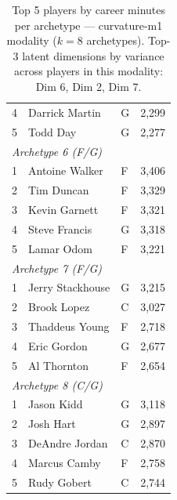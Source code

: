 \begin{table}[htbp]
\begin{tabular}{rlll}
    4 & Darrick Martin & G & 2,299 \\
    5 & Todd Day & G & 2,277 \\
    \midrule[0.4pt]
    \multicolumn{4}{l}{\textit{Archetype 6 (F/G)}} \\
    \midrule
    1 & Antoine Walker & F & 3,406 \\
    2 & Tim Duncan & F & 3,329 \\
    3 & Kevin Garnett & F & 3,321 \\
    4 & Steve Francis & G & 3,318 \\
    5 & Lamar Odom & F & 3,221 \\
    \midrule[0.4pt]
    \multicolumn{4}{l}{\textit{Archetype 7 (F/G)}} \\
    \midrule
    1 & Jerry Stackhouse & G & 3,215 \\
    2 & Brook Lopez & C & 3,027 \\
    3 & Thaddeus Young & F & 2,718 \\
    4 & Eric Gordon & G & 2,677 \\
    5 & Al Thornton & F & 2,654 \\
    \midrule[0.4pt]
    \multicolumn{4}{l}{\textit{Archetype 8 (C/G)}} \\
    \midrule
    1 & Jason Kidd & G & 3,118 \\
    2 & Josh Hart & G & 2,897 \\
    3 & DeAndre Jordan & C & 2,870 \\
    4 & Marcus Camby & F & 2,758 \\
    5 & Rudy Gobert & C & 2,744 \\
    \bottomrule
  \end{tabular}
  \caption{Top 5 players by career minutes per archetype --- curvature-m1 modality ($k=8$ archetypes). Top-3 latent dimensions by variance across players in this modality: Dim 6, Dim 2, Dim 7.}
  \label{tab:arch_reps_curvature_m1}
\end{table}

